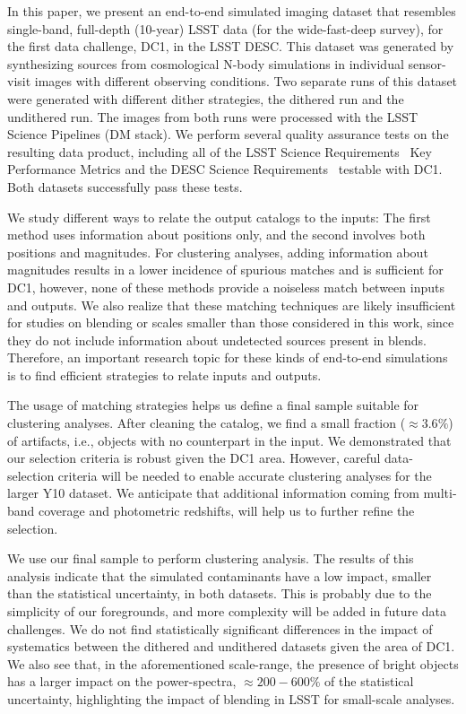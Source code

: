 \documentclass[\docopts]{\docclass}
\begin{document}
In this paper, we present an end-to-end simulated imaging dataset that resembles single-band, full-depth (10-year) LSST data (for the wide-fast-deep survey), for the first data challenge, DC1, in the LSST DESC. This dataset was generated by synthesizing sources from cosmological N-body simulations in individual sensor-visit images with different observing conditions. Two separate runs of this dataset were generated with different dither strategies, the dithered run and the undithered run. The images from both runs were processed with the LSST Science Pipelines (DM stack). We perform several quality assurance tests on the resulting data product, including all of the LSST Science Requirements~\citep{LPM-17} Key Performance Metrics and the DESC Science Requirements~\citep{2018arXiv180901669T} testable with DC1. Both datasets successfully pass these tests.

We study different ways to relate the output catalogs to the inputs: The first method uses information about positions only, and the second involves both positions and magnitudes. For clustering analyses, adding information about magnitudes results in a lower incidence of spurious matches and is sufficient for DC1, however, none of these methods provide a noiseless match between inputs and outputs. We also realize that these matching techniques are likely insufficient for studies on blending or scales smaller than those considered in this work, since they do not include information about undetected sources present in blends. Therefore, an important research topic for these kinds of end-to-end simulations is to find efficient strategies to relate inputs and outputs. 

The usage of matching strategies helps us define a final sample suitable for clustering analyses. After cleaning the catalog, we find a small fraction ($\approx 3.6\%$) of artifacts, i.e., objects with no counterpart in the input. We demonstrated that our selection criteria is robust given the DC1 area. However, careful data-selection criteria will be needed to enable accurate clustering analyses for the larger Y10 dataset. We anticipate that additional information coming from multi-band coverage and photometric redshifts, will help us to further refine the selection.

We use our final sample to perform clustering analysis. The results of this analysis indicate that the simulated contaminants have a low impact, smaller than the statistical uncertainty, in both datasets. This is probably due to the simplicity of our foregrounds, and more complexity will be added in future data challenges. We do not find statistically significant differences in the impact of systematics between the dithered and undithered datasets given the area of DC1. We also see that, in the aforementioned scale-range, the presence of bright objects has a larger impact on the power-spectra, $\approx 200-600\%$ of the statistical uncertainty, highlighting the impact of blending in LSST for small-scale analyses.
\end{document}
